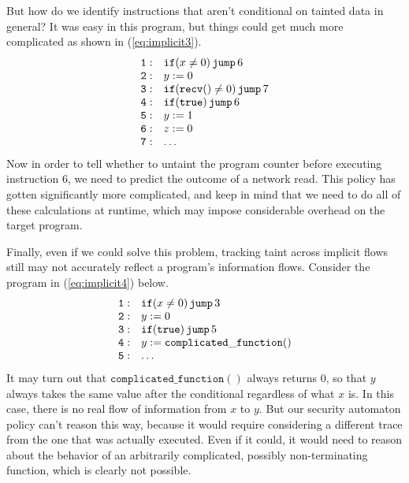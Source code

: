 \documentclass[11pt,twoside]{scrartcl}
\begin{document}
But how do we identify instructions that aren't conditional on tainted data in general? It was easy in this program, but things could get much more complicated as shown in (\ref{eq:implicit3}).
\begin{equation}
\label{eq:implicit3}
\begin{array}{ll}
\mathtt{1:} & \pifjump{x \ne 0}{6} \\
\mathtt{2:} & y := 0 \\
\mathtt{3:} & \pifjump{\precv\mathtt{()} \ne 0}{7} \\
\mathtt{4:} & \pifjump{\mathtt{true}}{6} \\
\mathtt{5:} & y := 1 \\
\mathtt{6:} & z := 0 \\
\mathtt{7:} & \ldots
\end{array}
\end{equation}
Now in order to tell whether to untaint the program counter before executing instruction 6, we need to predict the outcome of a network read. This policy has gotten significantly more complicated, and keep in mind that we need to do all of these calculations at runtime, which may impose considerable overhead on the target program.

Finally, even if we could solve this problem, tracking taint across implicit flows still may not accurately reflect a program's information flows. Consider the program in (\ref{eq:implicit4}) below.
\begin{equation}
\label{eq:implicit4}
\begin{array}{ll}
\mathtt{1:} & \pifjump{x \ne 0}{3} \\
\mathtt{2:} & y := 0 \\
\mathtt{3:} & \pifjump{\mathtt{true}}{5} \\
\mathtt{4:} & y := \mathtt{complicated\_function()} \\
\mathtt{5:} & \ldots
\end{array}
\end{equation}
It may turn out that $\mathtt{complicated\_function()}$ always returns 0, so that $y$ always takes the same value after the conditional regardless of what $x$ is. In this case, there is no real flow of information from $x$ to $y$. But our security automaton policy can't reason this way, because it would require considering a different trace from the one that was actually executed. Even if it could, it would need to reason about the behavior of an arbitrarily complicated, possibly non-terminating function, which is clearly not possible.
\end{document}
